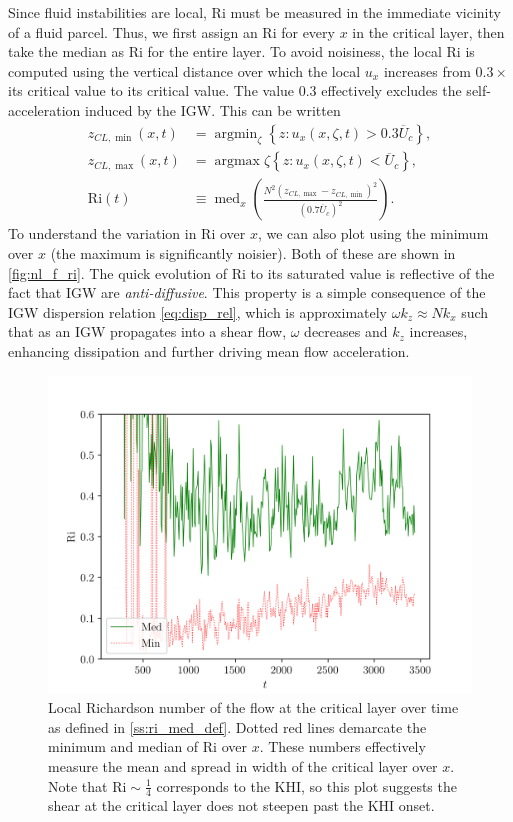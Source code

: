 \documentclass[
        fleqn,
        usenatbib,
    ]{mnras}
\newcommand*{\p}[1]{\left(#1\right)}
\newcommand*{\z}[1]{\left\{#1\right\}}
\DeclareMathOperator*{\argmin}{argmin}
\DeclareMathOperator*{\argmax}{argmax}
\DeclareMathOperator*{\med}{med}
\begin{document}
Since fluid instabilities are local, $\mathrm{Ri}$ must be measured in the
immediate vicinity of a fluid parcel. Thus, we first assign an $\mathrm{Ri}$ for
every $x$ in the critical layer, then take the median as $\mathrm{Ri}$ for the
entire layer. To avoid noisiness, the local $\mathrm{Ri}$ is computed using the
vertical distance over which the local $u_x$ increases from $0.3 \times$ its
critical value to its critical value. The value $0.3$ effectively excludes the
self-acceleration induced by the IGW\@. This can be written
\begin{align}
    z_{CL, \min}(x, t) &= \argmin_\zeta
        \z{z: u_x(x, \zeta, t) > 0.3\overline{U}_c},\nonumber\\
    z_{CL, \max}(x, t) &= \argmax
        \zeta \z{z: u_x(x, \zeta, t) < \overline{U}_c},\nonumber\\
    \mathrm{Ri}(t) &\equiv
        \med_x\p{\frac{N^2 \p{z_{CL, \max} - z_{CL, \min}}^2}{(0.7
            \overline{U}_c)^2}}.\label{ss:ri_med_def}
\end{align}
To understand the variation in $\mathrm{Ri}$ over $x$, we can also plot using
the minimum over $x$ (the maximum is significantly noisier). Both of these are
shown in \autoref{fig:nl_f_ri}. The quick evolution of $\mathrm{Ri}$ to its
saturated value is reflective of the fact that IGW are \emph{anti-diffusive}.
This property is a simple consequence of the IGW dispersion relation
\autoref{eq:disp_rel}, which is approximately $\omega k_z \approx Nk_x$ such
that as an IGW propagates into a shear flow, $\omega$ decreases and $k_z$
increases, enhancing dissipation and further driving mean flow acceleration.
\begin{figure}
    \centering
    \includegraphics[width=\columnwidth]{plots/nl_f_ri.png}
    \caption{Local Richardson number of the flow at the critical layer over time
    as defined in \autoref{ss:ri_med_def}. Dotted red lines demarcate the
    minimum and median of $\mathrm{Ri}$ over $x$. These numbers effectively
    measure the mean and spread in width of the critical layer over $x$. Note
    that $\mathrm{Ri} \sim \frac{1}{4}$ corresponds to the KHI, so this plot
    suggests the shear at the critical layer does not steepen past the KHI
    onset.}\label{fig:nl_f_ri}
\end{figure}
\end{document}
